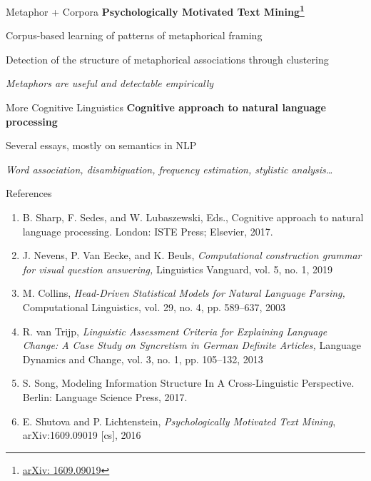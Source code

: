 \documentclass[aspectratio=169,cramped]{beamer}
\let\tempone\itemize
\let\temptwo\enditemize
\renewenvironment{itemize}{\tempone\addtolength{\itemsep}{-0\baselineskip}\addtolength{\parskip}{-0.2\baselineskip}}{\temptwo}
\begin{document}
\begin{frame}{Metaphor + Corpora}
	\textbf{Psychologically Motivated Text Mining\footnote{\protect\href{http://arxiv.org/abs/1609.09019}{arXiv: 1609.09019}}}
  \begin{itemize}
  \item Corpus-based learning of patterns of metaphorical framing
  \item Detection of the structure of metaphorical associations through clustering
  \item \textit{Metaphors are useful and detectable empirically}
  \end{itemize}
\end{frame}

\begin{frame}{More Cognitive Linguistics}
	\textbf{Cognitive approach to natural language processing}
  \begin{itemize}
  \item Several essays, mostly on semantics in NLP
  \item \textit{Word association, disambiguation, frequency estimation, stylistic analysis\ldots}
  \end{itemize}
\end{frame}


\begin{frame}{References}
  \begin{enumerate}
  \scriptsize
  \item B. Sharp, F. Sedes, and W. Lubaszewski, Eds., Cognitive approach to natural language processing. London: ISTE Press; Elsevier, 2017.
  \item J. Nevens, P. Van Eecke, and K. Beuls, \textit{Computational construction grammar for visual question answering,} Linguistics Vanguard, vol. 5, no. 1, 2019
  \item M. Collins, \textit{Head-Driven Statistical Models for Natural Language Parsing,} Computational Linguistics, vol. 29, no. 4, pp. 589--637, 2003
  \item R. van Trijp, \textit{Linguistic Assessment Criteria for Explaining Language Change: A Case Study on Syncretism in German Definite Articles,} Language Dynamics and Change, vol. 3, no. 1, pp. 105–132, 2013
  \item S. Song, Modeling Information Structure In A Cross-Linguistic Perspective. Berlin: Language Science Press, 2017.
  \item E. Shutova and P. Lichtenstein, \textit{Psychologically Motivated Text Mining}, arXiv:1609.09019 [cs], 2016
  \end{enumerate}
\end{frame}
\end{document}
